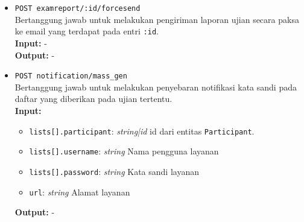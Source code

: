 \begin{itemize}
        \item \texttt{POST examreport/:id/forcesend} \\
            Bertanggung jawab untuk melakukan pengiriman laporan ujian secara
            paksa ke email yang terdapat pada entri \texttt{:id}.\\
            \textbf{Input:} -\\
            \textbf{Output:} -
            
        \item \texttt{POST notification/mass\_gen} \\
            Bertanggung jawab untuk melakukan penyebaran notifikasi kata sandi
            pada daftar yang diberikan pada ujian tertentu.\\
            \textbf{Input:} \begin{itemize}
                \item \texttt{lists[].participant}: \textit{string|id} id dari
                    entitas \texttt{Participant}.
                \item \texttt{lists[].username}: \textit{string} Nama pengguna
                layanan
                \item \texttt{lists[].password}: \textit{string} Kata sandi
                layanan
                \item \texttt{url}: \textit{string} Alamat layanan
            \end{itemize}
            \textbf{Output:} -
    \end{itemize}
    
